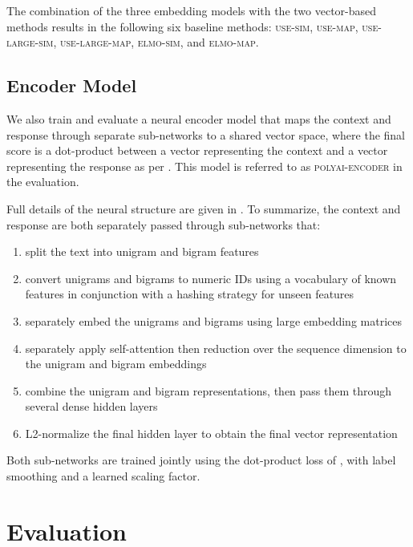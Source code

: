 \documentclass[11pt,a4paper,table]{article}
\newcommand\encoder{polyai-encoder}
\newcommand\encoder{encoder}
\begin{document}
The combination of the three embedding models with the two vector-based methods results in the following six baseline methods: \textsc{use-sim, use-map, use-large-sim, use-large-map, elmo-sim,} and \textsc{elmo-map}.


\subsection{Encoder Model} \label{sec:encoder}

We also train and evaluate a neural encoder model that maps the context and response through separate sub-networks to a shared vector space, where the final score is a dot-product between a vector representing the context and a vector representing the response as per . This model is referred to as \textsc{\encoder} in the evaluation.

Full details of the neural structure are given in . To summarize, the context and response are both separately passed through sub-networks that:

\begin{enumerate}
  \setlength\itemsep{0.1em}
    \item split the text into unigram and bigram features
    \item convert unigrams and bigrams to numeric IDs using a vocabulary of known features in conjunction with a hashing strategy for unseen features
    \item separately embed the unigrams and bigrams using large embedding matrices
    \item separately apply self-attention then reduction over the sequence dimension to the unigram and bigram embeddings
    \item combine the unigram and bigram representations, then pass them through several dense hidden layers
    \item L2-normalize the final hidden layer to obtain the final vector representation
\end{enumerate}

Both sub-networks are trained jointly using the dot-product loss of , with label smoothing and a learned scaling factor.

\section{Evaluation} \label{sec:evaluation}
\end{document}
